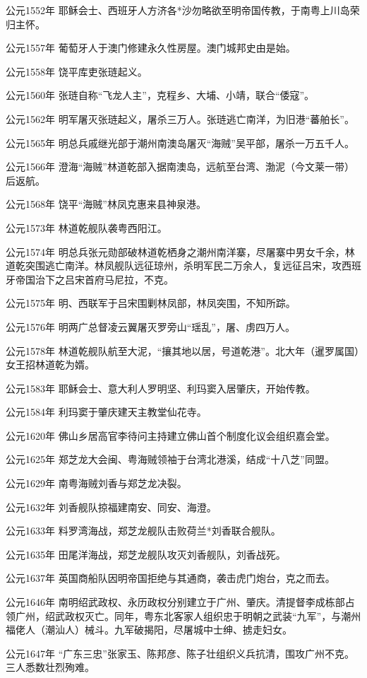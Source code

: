 公元1552年 耶稣会士、西班牙人方济各*沙勿略欲至明帝国传教，于南粤上川岛荣归主怀。

公元1557年 葡萄牙人于澳门修建永久性房屋。澳门城邦史由是始。

公元1558年 饶平库吏张琏起义。

公元1560年 张琏自称“飞龙人主”，克程乡、大埔、小靖，联合“倭寇”。

公元1562年 明军屠灭张琏起义，屠杀三万人。张琏逃亡南洋，为旧港“蕃舶长”。

公元1565年 明总兵戚继光部于潮州南澳岛屠灭“海贼”吴平部，屠杀一万五千人。

公元1566年 澄海“海贼”林道乾部入据南澳岛，远航至台湾、渤泥（今文莱一带）后返航。

公元1568年 饶平“海贼”林凤克惠来县神泉港。

公元1573年 林道乾舰队袭粤西阳江。

公元1574年 明总兵张元勋部破林道乾栖身之潮州南洋寨，尽屠寨中男女千余，林道乾突围逃亡南洋。林凤舰队远征琼州，杀明军民二万余人，复远征吕宋，攻西班牙帝国治下之吕宋首府马尼拉，不克。

公元1575年 明、西联军于吕宋围剿林凤部，林凤突围，不知所踪。

公元1576年 明两广总督凌云翼屠灭罗旁山“瑶乱”，屠、虏四万人。

公元1578年 林道乾舰队航至大泥，“攘其地以居，号道乾港”。北大年（暹罗属国）女王招林道乾为婿。

公元1583年 耶稣会士、意大利人罗明坚、利玛窦入居肇庆，开始传教。

公元1584年 利玛窦于肇庆建天主教堂仙花寺。

公元1620年 佛山乡居高官李待问主持建立佛山首个制度化议会组织嘉会堂。

公元1625年 郑芝龙大会闽、粤海贼领袖于台湾北港溪，结成“十八芝”同盟。

公元1629年 南粤海贼刘香与郑芝龙决裂。

公元1632年 刘香舰队掠福建南安、同安、海澄。

公元1633年 料罗湾海战，郑芝龙舰队击败荷兰*刘香联合舰队。

公元1635年 田尾洋海战，郑芝龙舰队攻灭刘香舰队，刘香战死。

公元1637年 英国商船队因明帝国拒绝与其通商，袭击虎门炮台，克之而去。

公元1646年 南明绍武政权、永历政权分别建立于广州、肇庆。清提督李成栋部占领广州，绍武政权灭亡。同年，粤东北客家人组织忠于明朝之武装“九军”，与潮州福佬人（潮汕人）械斗。九军破揭阳，尽屠城中士绅、掳走妇女。

公元1647年 “广东三忠”张家玉、陈邦彦、陈子壮组织义兵抗清，围攻广州不克。三人悉数壮烈殉难。

